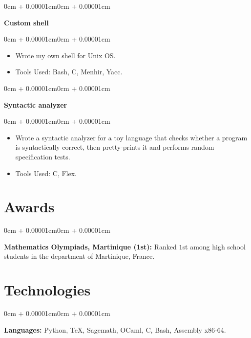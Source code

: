 \documentclass[10pt, letterpaper]{article}
\newenvironment{highlights}{
    \begin{itemize}[
        topsep=0.10cm,
        parsep=0.10cm,
        partopsep=0pt,
        itemsep=0pt,
        leftmargin=0cm + 10pt
    ]
}{
    \end{itemize}
}
\newenvironment{onecolentry}{
    \begin{adjustwidth}{0cm + 0.00001cm}{0cm + 0.00001cm}
}{
    \end{adjustwidth}
}
\begin{document}
\begin{onecolentry}
    \textbf{Custom shell}
\end{onecolentry}

\vspace{0.10cm}
\begin{onecolentry}
    \begin{highlights}
        \item Wrote my own shell for Unix OS.
        \item Tools Used: Bash, C, Menhir, Yacc.
    \end{highlights}
\end{onecolentry}

\vspace{0.2cm}

\begin{onecolentry}
    \textbf{Syntactic analyzer}
\end{onecolentry}

\vspace{0.10cm}
\begin{onecolentry}
    \begin{highlights}
        \item Wrote a syntactic analyzer for a toy language that checks whether a program is syntactically correct, then pretty-prints it and performs random specification tests.
        \item Tools Used: C, Flex.
    \end{highlights}
\end{onecolentry}

\vspace{0.2cm}

\section{Awards}

\begin{onecolentry}
    \textbf{Mathematics Olympiads, Martinique (1st):} Ranked $1$st among high school students in the department of Martinique, France.
\end{onecolentry}

\section{Technologies}

\begin{onecolentry}
    \textbf{Languages:} Python, \TeX, Sagemath, OCaml, C, Bash, Assembly x86-64.
\end{onecolentry}
\end{document}
